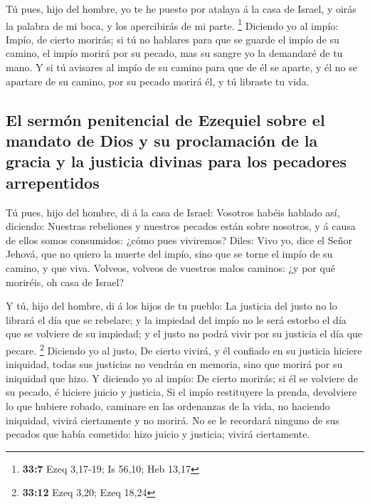  Tú pues, hijo del hombre, yo te he puesto por atalaya á
la casa de Israel, y oirás la palabra de mi boca, y los apercibirás de
mi parte. \footnote{\textbf{33:7} Ezeq 3,17-19; Is 56,10; Heb 13,17}
 Diciendo yo al impío: Impío, de cierto morirás; si tú no
hablares para que se guarde el impío de su camino, el impío morirá por
su pecado, mas su sangre yo la demandaré de tu mano.  Y si
tú avisares al impío de su camino para que de él se aparte, y él no se
apartare de su camino, por su pecado morirá él, y tú libraste tu vida.

\hypertarget{el-sermuxf3n-penitencial-de-ezequiel-sobre-el-mandato-de-dios-y-su-proclamaciuxf3n-de-la-gracia-y-la-justicia-divinas-para-los-pecadores-arrepentidos}{%
\subsection{El sermón penitencial de Ezequiel sobre el mandato de Dios y
su proclamación de la gracia y la justicia divinas para los pecadores
arrepentidos}\label{el-sermuxf3n-penitencial-de-ezequiel-sobre-el-mandato-de-dios-y-su-proclamaciuxf3n-de-la-gracia-y-la-justicia-divinas-para-los-pecadores-arrepentidos}}

 Tú pues, hijo del hombre, di á la casa de Israel:
Vosotros habéis hablado así, diciendo: Nuestras rebeliones y nuestros
pecados están sobre nosotros, y á causa de ellos somos consumidos: ¿cómo
pues viviremos?  Diles: Vivo yo, dice el Señor Jehová,
que no quiero la muerte del impío, sino que se torne el impío de su
camino, y que viva. Volveos, volveos de vuestros malos caminos: ¿y por
qué moriréis, oh casa de Israel?

 Y tú, hijo del hombre, di á los hijos de tu pueblo: La
justicia del justo no lo librará el día que se rebelare; y la impiedad
del impío no le será estorbo el día que se volviere de su impiedad; y el
justo no podrá vivir por su justicia el día que pecare. \footnote{\textbf{33:12}
  Ezeq 3,20; Ezeq 18,24}  Diciendo yo al justo, De cierto
vivirá, y él confiado en su justicia hiciere iniquidad, todas sus
justicias no vendrán en memoria, sino que morirá por su iniquidad que
hizo.  Y diciendo yo al impío: De cierto morirás; si él
se volviere de su pecado, é hiciere juicio y justicia, 
Si el impío restituyere la prenda, devolviere lo que hubiere robado,
caminare en las ordenanzas de la vida, no haciendo iniquidad, vivirá
ciertamente y no morirá.  No se le recordará ninguno de
sus pecados que había cometido: hizo juicio y justicia; vivirá
ciertamente.

